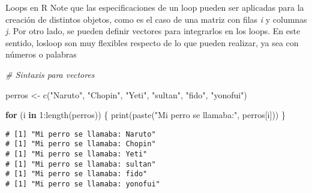 \documentclass[
  8pt,
  ignorenonframetext,
]{beamer}
\newenvironment{Shaded}{\begin{snugshade}}{\end{snugshade}}
\newcommand{\CommentTok}[1]{\textcolor[rgb]{0.56,0.35,0.01}{\textit{#1}}}
\newcommand{\ControlFlowTok}[1]{\textcolor[rgb]{0.13,0.29,0.53}{\textbf{#1}}}
\newcommand{\DecValTok}[1]{\textcolor[rgb]{0.00,0.00,0.81}{#1}}
\newcommand{\FunctionTok}[1]{\textcolor[rgb]{0.00,0.00,0.00}{#1}}
\newcommand{\NormalTok}[1]{#1}
\newcommand{\OtherTok}[1]{\textcolor[rgb]{0.56,0.35,0.01}{#1}}
\newcommand{\SpecialCharTok}[1]{\textcolor[rgb]{0.00,0.00,0.00}{#1}}
\newcommand{\StringTok}[1]{\textcolor[rgb]{0.31,0.60,0.02}{#1}}
\begin{document}
\begin{frame}[fragile]{Loops en R}
\protect\hypertarget{loops-en-r-2}{}
Note que las especificaciones de un loop pueden ser aplicadas para la
creación de distintos objetos, como es el caso de una matriz con filas
\emph{i} y columnas \emph{j}. Por otro lado, se pueden definir vectores
para integrarlos en los loops. En este sentido, losloop son muy
flexibles respecto de lo que pueden realizar, ya sea con números o
palabras

\begin{Shaded}
\begin{Highlighting}[]
\CommentTok{\# Sintaxis para vectores}

\NormalTok{perros }\OtherTok{\textless{}{-}} \FunctionTok{c}\NormalTok{(}\StringTok{"Naruto"}\NormalTok{, }\StringTok{"Chopin"}\NormalTok{, }\StringTok{"Yeti"}\NormalTok{, }\StringTok{"sultan"}\NormalTok{, }\StringTok{"fido"}\NormalTok{, }\StringTok{"yonofui"}\NormalTok{)}

\ControlFlowTok{for}\NormalTok{ (i }\ControlFlowTok{in} \DecValTok{1}\SpecialCharTok{:}\FunctionTok{length}\NormalTok{(perros)) \{}
  \FunctionTok{print}\NormalTok{(}\FunctionTok{paste}\NormalTok{(}\StringTok{"Mi perro se llamaba:"}\NormalTok{, perros[i]))}
\NormalTok{\}}
\end{Highlighting}
\end{Shaded}

\begin{verbatim}
# [1] "Mi perro se llamaba: Naruto"
# [1] "Mi perro se llamaba: Chopin"
# [1] "Mi perro se llamaba: Yeti"
# [1] "Mi perro se llamaba: sultan"
# [1] "Mi perro se llamaba: fido"
# [1] "Mi perro se llamaba: yonofui"
\end{verbatim}
\end{frame}
\end{document}
